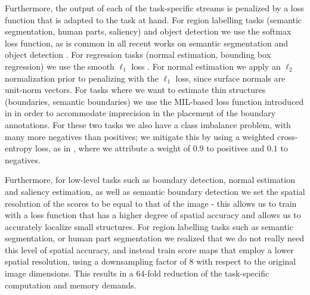 \documentclass[10pt,twocolumn,letterpaper]{article}
\begin{document}

Furthermore, the output of each of the task-specific streams is penalized by a loss function that is adapted to the task at hand. 
 For region labelling tasks (semantic segmentation, human parts, saliency) and object detection we use the softmax loss function, as is common in all recent works on semantic segmentation \cite{LongSD15,Chen2015iclr} and object detection \cite{Girshick15}. For regression tasks (normal estimation, bounding box regression)
 we use the smooth $\ell_1$ loss \cite{Girshick15}. For normal estimation we apply an $\ell_2$ normalization prior to penalizing with the $\ell_1$ loss, since surface normals are unit-norm vectors. 
 For tasks where we want to estimate thin structures (boundaries, semantic boundaries) we use the MIL-based loss function introduced in \cite{iclr16} in order to  accommodate imprecision in the placement of the boundary annotations. For these two tasks we also have a  class imbalance problem, with many more negatives than positives; we mitigate this by using a weighted cross-entropy loss, as in \cite{hed}, where we  attribute a weight of $0.9$ to positives and $0.1$ to negatives. 
 
Furthermore, for  low-level tasks such as boundary detection, normal estimation and saliency estimation, as well as semantic boundary detection we set the spatial resolution of the scores to be  equal to that of the image - this allows us to train with a loss function that has a higher degree of spatial accuracy and allows us to accurately localize small structures. For region labelling tasks such as semantic segmentation, or human part segmentation we realized that we do not really need this level of spatial accuracy, and instead train score maps that employ a lower spatial resolution, using a downsampling factor of 8 with respect to the original image dimensions. This results in a 64-fold reduction of  the task-specific computation and memory demands. 
\end{document}
